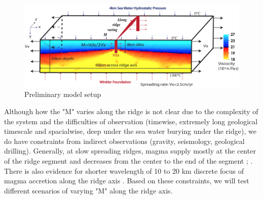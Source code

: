 \documentclass[12pt]{article}
\begin{document}
\begin{figure}[H]
 \centering
  \includegraphics[scale=0.5]{fig8_1.png}
 \caption{\small Preliminary model setup}
 \label{fig8_1}
\end{figure}


Although how the "M" varies along the ridge is not clear due to the complexity of the system and the difficulties of observation (timewise, extremely long geological timescale and spacialwise, deep under the sea water burying under the ridge), we do have constraints from indirect observations (gravity, seismology, geological drilling). Generally, at slow spreading ridges, magma supply mostly at the center of the ridge segment and decreases from the center to the end of the segment \citep{Tolstoy1993}; \citep{Chen1999}. There is also evidence for shorter wavelength of 10 to 20 km discrete focus of magma accretion along the ridge axis \citep{Lin1990}. Based on these constraints, we will test different scenarios of varying "M" along the ridge axis.



\break
\end{document}
